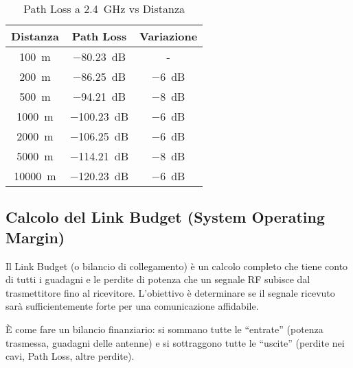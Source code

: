 \begin{table}[H]
\centering
\begin{tabular}{|c|c|c|}
\hline
\textbf{Distanza} & \textbf{Path Loss} & \textbf{Variazione} \\ \hline
\SI{100}{\meter} & \SI{-80.23}{dB} & - \\ \hline
\SI{200}{\meter} & \SI{-86.25}{dB} & \SI{-6}{dB} \\ \hline
\SI{500}{\meter} & \SI{-94.21}{dB} & \SI{-8}{dB} \\ \hline
\SI{1000}{\meter} & \SI{-100.23}{dB} & \SI{-6}{dB} \\ \hline
\SI{2000}{\meter} & \SI{-106.25}{dB} & \SI{-6}{dB} \\ \hline
\SI{5000}{\meter} & \SI{-114.21}{dB} & \SI{-8}{dB} \\ \hline
\SI{10000}{\meter} & \SI{-120.23}{dB} & \SI{-6}{dB} \\ \hline
\end{tabular}
\label{tab:path_loss_example}
\caption{Path Loss a \SI{2.4}{\giga\hertz} vs Distanza}
\end{table}

\subsection{Calcolo del Link Budget (System Operating Margin)}
Il Link Budget (o bilancio di collegamento) è un calcolo completo che tiene conto di tutti i guadagni e le perdite di potenza che un segnale RF subisce dal trasmettitore fino al ricevitore. L'obiettivo è determinare se il segnale ricevuto sarà sufficientemente forte per una comunicazione affidabile.

È come fare un bilancio finanziario: si sommano tutte le ``entrate'' (potenza trasmessa, guadagni delle antenne) e si sottraggono tutte le ``uscite'' (perdite nei cavi, Path Loss, altre perdite).

